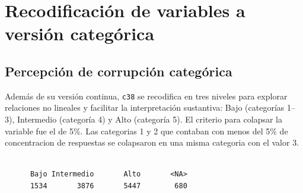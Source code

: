 \documentclass[
  spanish,
  a4paper,
  oneside]{scrbook}
\newenvironment{Shaded}{\begin{snugshade}}{\end{snugshade}}
\newcommand{\AttributeTok}[1]{\textcolor[rgb]{0.40,0.45,0.13}{#1}}
\newcommand{\ConstantTok}[1]{\textcolor[rgb]{0.56,0.35,0.01}{#1}}
\newcommand{\DecValTok}[1]{\textcolor[rgb]{0.68,0.00,0.00}{#1}}
\newcommand{\FunctionTok}[1]{\textcolor[rgb]{0.28,0.35,0.67}{#1}}
\newcommand{\NormalTok}[1]{\textcolor[rgb]{0.00,0.23,0.31}{#1}}
\newcommand{\OtherTok}[1]{\textcolor[rgb]{0.00,0.23,0.31}{#1}}
\newcommand{\SpecialCharTok}[1]{\textcolor[rgb]{0.37,0.37,0.37}{#1}}
\newcommand{\StringTok}[1]{\textcolor[rgb]{0.13,0.47,0.30}{#1}}
\begin{document}
\chapter{Recodificación de variables a versión
categórica}\label{recodificaciuxf3n-de-variables-a-versiuxf3n-categuxf3rica}

\section{Percepción de corrupción
categórica}\label{percepciuxf3n-de-corrupciuxf3n-categuxf3rica}

Además de su versión continua, \texttt{c38} se recodifica en tres
niveles para explorar relaciones no lineales y facilitar la
interpretación sustantiva: Bajo (categorías 1--3), Intermedio (categoría
4) y Alto (categoría 5). El criterio para colapsar la variable fue el de
5\%. Las categorias 1 y 2 que contaban con menos del 5\% de
concentracion de respuestas se colapsaron en una misma categoria con el
valor 3.

\begin{Shaded}
\end{Shaded}

\begin{verbatim}

      Bajo Intermedio       Alto       <NA> 
      1534       3876       5447        680 
\end{verbatim}
\end{document}
